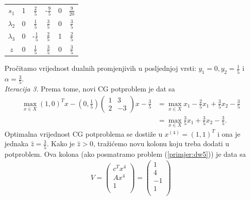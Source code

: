 \documentclass[a4paper, utf8, 11pt, colorlinks]{book}
\theoremstyle{definition}
\begin{document}
\begin{center}
	
	\begin{tabular}{c|cccc|c}
		$s_1$	    &   1      &    $\frac{2}{5}$          &   -$\frac{9}{5}$       &   0          &  $\frac{9}{20}$ \\
		$\lambda_2$  &   0      &    $\frac{1}{5}$         &   $\frac{3}{5}$        &   0          &  $\frac{3}{5}$             \\
		$\lambda_3$  &   0      &    -$\frac{1}{5}$        &   $\frac{2}{5}$        &   1          &  $\frac{2}{5}$            \\ \hline
		$z$          &   0      &    $\frac{1}{5}$         &  $ \frac{3}{5}$        &   0           & $\frac{3}{5}$
	\end{tabular}
	
\end{center} 
  Pročitamo vrijednost dualnih promjenjivih u posljednjoj vrsti: $y_1 =0, y_2=\frac{1}{5}$ i $\alpha=\frac{3}{5}$.\\ \emph{Iteracija 3.} Prema tome, novi CG potproblem je dat sa 
  \begin{align*}
        \max_{x \in X} (1, 0)^T x - (0, \frac{1}{5})\left(\begin{array}{cc}
       	1 & 3 \\
       	2 & -3
       \end{array}\right)  x   - \frac{3}{5} &= \max_{x \in X}x_1  - \frac{2}{5}x_1 + \frac{3}{5}x_2 - \frac{3}{5} \\
       &= \max_{x \in X} \frac{3}{5}x_1 + \frac{3}{5}x_2 - \frac{3}{5}.
  \end{align*} 
Optimalna vrijednost CG potproblema se dostiže u $x^{(4)} = (1, 1)^T$ i ona je jednaka $\hat{z}=\frac{3}{5}$. Kako je $\hat{z}>0$, tražićemo novu kolonu koju treba dodati u potproblem. Ova kolona (ako posmatramo problem (\ref{primjer:dw5})) je   data sa 
\begin{align}
	V =   \begin{pmatrix}
		c^T x^4\\
		A x^4  \\
		1     \\
	\end{pmatrix} = \begin{pmatrix}
		1 \\
		4  \\
		-1  \\
		1\\  
	\end{pmatrix}
\end{align}
\end{document}
